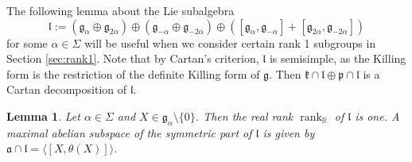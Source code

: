 \documentclass[12pt]{amsart}
\newcommand{\R}{\mathbb{R} }
\newcommand{\frakg}{\mathfrak{g}}
\newcommand{\frakp}{\mathfrak{p}}
\newcommand{\frakk}{\mathfrak{k}}
\newcommand{\fraka}{\mathfrak{a}}
\newcommand{\frakl}{\mathfrak{l}}
\numberwithin{equation}{section}
\newtheorem{lemma}[theorem]{Lemma}
\theoremstyle{remark} %
\begin{document}
The following lemma about the Lie subalgebra  
$$
\frakl := ( \frakg_\alpha \oplus \frakg_{2\alpha} ) \oplus (\frakg_{-\alpha} \oplus \frakg_{-2\alpha} ) \oplus ( [\frakg_\alpha , \frakg_{-\alpha}] + [\frakg_{2\alpha}, \frakg_{-2\alpha}] )
$$
for some $\alpha \in \Sigma$ will be useful when we consider certain rank 1 subgroups in Section \ref{sec:rank1}. Note that by Cartan's criterion, $\frakl$ is semisimple, as the Killing form is the restriction of the definite Killing form of $\frakg$. Then $\frakk \cap \frakl \oplus \frakp \cap \frakl$ is a Cartan decomposition of $\frakl$.
\begin{lemma}\label{lem:levi_algebra} 
	Let $\alpha \in \Sigma$ and $X\in \frakg_\alpha  \setminus \{0\}$. Then the real rank $\operatorname{rank}_\R$ of $\frakl$ is one. A maximal abelian subspace of the symmetric part of $\frakl$ is given by $\fraka \cap \frakl = \langle [X,\theta(X)]\rangle$.
\end{lemma}
\end{document}
